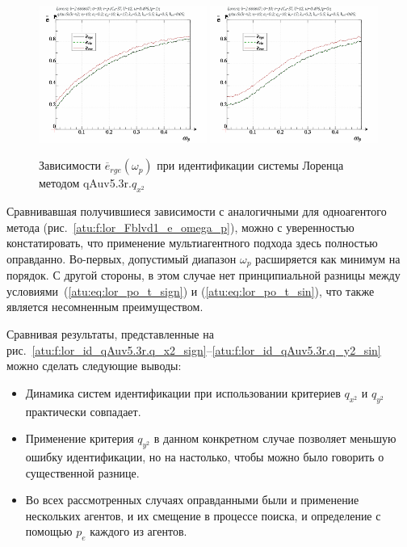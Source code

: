 \begin{figure}[h!]
  \centerline{
    \includegraphics[width=0.49\textwidth]{p/cha/lor/qAuv5.3r/lor_qAuv5_3r_qx2-p_omega_p_e_sign.png}
    \hfill
    \includegraphics[width=0.49\textwidth]{p/cha/lor/qAuv5.3r/lor_qAuv5_3r_qx2-p_omega_p_e_sin.png}
  }
  \caption{Зависимости $\overline{e}_{rge}(\omega_p)$ при идентификации системы Лоренца методом qAuv5.3r.$q_{x^2}$}
  \label{atu:f:lor_qAuv5.3r_e_omega_p}
\end{figure}

Сравнивавшая получившиеся зависимости с аналогичными для одноагентого метода (рис.~\ref{atu:f:lor_Fblvd1_e_omega_p}),
можно с уверенностью констатировать,
что применение мультиагентного подхода здесь полностью оправданно.
Во-первых, допустимый диапазон $\omega_p$ расширяется как минимум на порядок. %
С другой стороны, в этом случае нет принципиальной разницы между
условиями~(\ref{atu:eq:lor_po_t_sign}) и (\ref{atu:eq:lor_po_t_sin}),
что также является несомненным преимуществом.




Сравнивая результаты, представленные на рис.~\ref{atu:f:lor_id_qAuv5.3r.q_x2_sign}--\ref{atu:f:lor_id_qAuv5.3r.q_y2_sin}
можно сделать следующие выводы:

\begin{itemize}

  \item
    Динамика систем идентификации при использовании критериев $q_{x^2}$ и $q_{y^2}$
    практически совпадает.

  \item
    Применение критерия  $q_{y^2}$ в данном конкретном случае позволяет
    меньшую ошибку идентификации, но на настолько,
    чтобы можно было говорить о существенной разнице.

  \item
    Во всех рассмотренных случаях оправданными были и применение нескольких агентов,
    и их смещение в процессе поиска, и определение с помощью $p_e$
    каждого из агентов.

\end{itemize}

